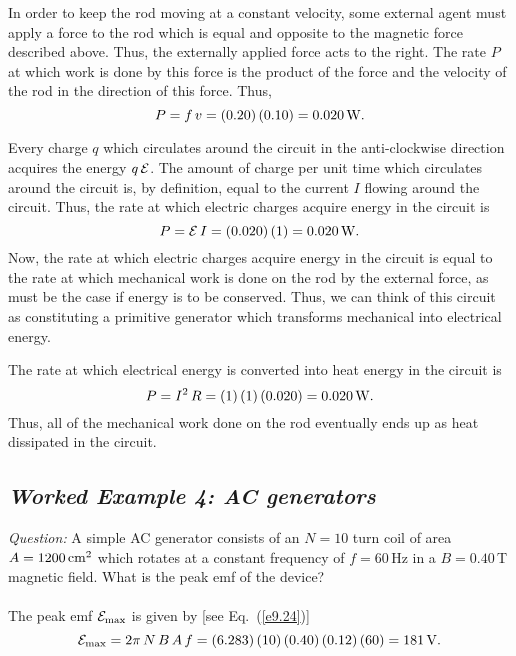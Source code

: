 In order to keep the rod moving at a constant velocity, some external
agent must apply a force to the rod which is equal and opposite to
the magnetic force described above. Thus, the externally applied force acts to
the right. 
The rate $P$ at which work is done
by this force is the product of the force and the velocity of the rod in the
direction of this force. Thus,
$$
P = f\,v = (0.20)\,(0.10) = 0.020\,{\rm W}.
$$

Every charge $q$ which circulates around the circuit in the anti-clockwise
direction acquires the energy $q\,{\cal E}$. The amount of charge per unit
time which circulates around the circuit is, by definition, equal to the
current $I$ flowing around the circuit. Thus, the rate at which electric charges
acquire energy in the circuit is 
$$
P = {\cal E}\,I = (0.020)\,(1) = 0.020\,{\rm W}.
$$
Now, the rate at which electric charges acquire energy in the circuit is equal
to the rate at which mechanical work is done on the rod  by the
external force, as must be the case if energy is to
be conserved. Thus, we can think of this circuit as constituting a
primitive  generator which transforms mechanical into electrical
energy. 

The rate at which electrical energy is converted into heat energy in the
circuit is
$$
P = I^2\,R = (1)\,(1)\,(0.020) = 0.020\,{\rm W}.
$$
Thus, all of the mechanical work done on the rod eventually ends up as heat dissipated
in the circuit.


\subsection*{\em Worked Example 4: AC generators}
{\em Question:} A simple AC generator consists of an $N=10$ turn coil of
area $A= 1200\,{\rm cm}^2$ which rotates at a constant frequency of
$f=60$\,Hz in a $B=0.40$\,T magnetic field. What is the peak emf of the device?\\
~\\
 The peak emf ${\cal E}_{\rm max}$ is given by [see Eq.~(\ref{e9.24})]
$$
{\cal E}_{\rm max} = 2\pi\,N\,B\,A\,f = (6.283)\,(10)\,(0.40)\,(0.12)\,(60) = 181 \,{\rm V}.
$$

